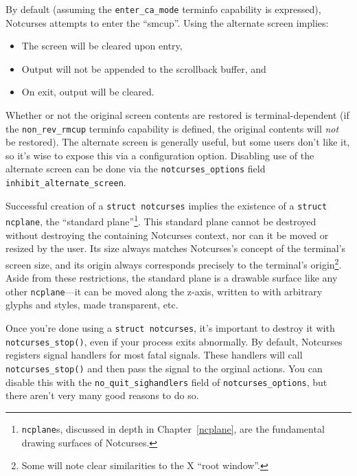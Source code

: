 \documentclass[letterpaper,10pt]{article}
\newenvironment{denseitemize}{
  \begin{itemize}
      \setlength{\itemsep}{0pt}
}{
  \end{itemize}
}
\begin{document}
By default (assuming the \texttt{enter\_ca\_mode} terminfo capability is expressed),
Notcurses attempts to enter the ``\gls{smcup}''. Using the alternate screen
implies:
\begin{denseitemize}
\item{The screen will be cleared upon entry,}
\item{Output will not be appended to the scrollback buffer, and}
\item{On exit, output will be cleared.}
\end{denseitemize}
Whether or not the original screen contents are restored is terminal-dependent
(if the \texttt{non\_rev\_rmcup} terminfo capability is defined, the original
contents will \textit{not} be restored). The alternate screen is generally
useful, but some users don't like it, so it's wise to expose this via a
configuration option. Disabling use of the alternate screen can be done via the
\texttt{notcurses\_options} field \texttt{inhibit\_alternate\_screen}.

Successful creation of a \texttt{struct notcurses} implies the existence of
a \texttt{struct ncplane}, the ``standard plane''\footnote{\texttt{ncplane}s,
discussed in depth in Chapter~\ref{ncplane}, are the fundamental drawing surfaces of Notcurses.}.
This standard plane cannot be destroyed without destroying the containing
Notcurses context, nor can it be moved or resized by the user. Its size always
matches Notcurses's concept of the terminal's screen size, and its origin
always corresponds precisely to the terminal's origin\footnote{Some will note
clear similarities to the X ``root window''\cite{joyofx}.}. Aside from these
restrictions, the standard plane is a drawable surface like any other
\texttt{ncplane}---it can be moved along the z-axis, written to with arbitrary
glyphs and styles, made transparent, etc.

Once you're done using a \texttt{struct notcurses}, it's important to destroy
it with \texttt{notcurses\_stop()}, even if your process exits abnormally. By
default, Notcurses registers signal handlers for most fatal signals. These
handlers will call \texttt{notcurses\_stop()} and then pass the signal to the
orginal actions. You can disable this with the \texttt{no\_quit\_sighandlers}
field of \texttt{notcurses\_options}, but there aren't very many good reasons
to do so.
\end{document}

